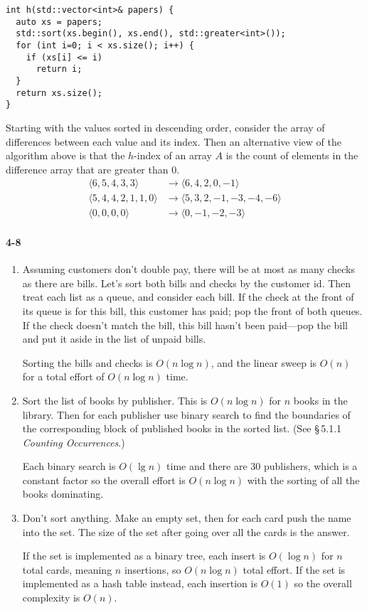 \documentclass{report}
\begin{document}
\begin{lstlisting}
int h(std::vector<int>& papers) {
  auto xs = papers;
  std::sort(xs.begin(), xs.end(), std::greater<int>());
  for (int i=0; i < xs.size(); i++) {
    if (xs[i] <= i)
      return i;
  }
  return xs.size();
}
\end{lstlisting}

Starting with the values sorted in descending order, consider the array of differences between each value and its index. Then an alternative view of the algorithm above is that the $h$-index of an array $A$ is the count of elements in the difference array that are greater than 0.
\begin{align*}
	\langle 6,5,4,3,3 \rangle &\to \langle 6,4,2,0,-1 \rangle \\
	\langle 5,4,4,2,1,1,0 \rangle &\to \langle 5,3,2,-1,-3,-4,-6 \rangle \\
	\langle 0,0,0,0 \rangle &\to \langle 0,-1,-2,-3 \rangle
\end{align*}

\paragraph{4-8}
\begin{enumerate}[label=(\alph*)]
	\item Assuming customers don't double pay, there will be at most as many checks as there are bills. Let's sort both bills and checks by the customer id. Then treat each list as a queue, and consider each bill. If the check at the front of its queue is for this bill, this customer has paid; pop the front of both queues. If the check doesn't match the bill, this bill hasn't been paid---pop the bill and put it aside in the list of unpaid bills.

	Sorting the bills and checks is $O(n\log n)$, and the linear sweep is $O(n)$ for a total effort of $O(n\log n)$ time.

	\item Sort the list of books by publisher. This is $O(n\log n)$ for $n$ books in the library. Then for each publisher use binary search to find the boundaries of the corresponding block of published books in the sorted list. (See \S\,5.1.1 {\sl Counting Occurrences\/}.)

	Each binary search is $O(\lg n)$ time and there are 30 publishers, which is a constant factor so the overall effort is $O(n\log n)$ with the sorting of all the books dominating.

	\item Don't sort anything. Make an empty set, then for each card push the name into the set. The size of the set after going over all the cards is the answer.

	If the set is implemented as a binary tree, each insert is $O(\log n)$ for $n$ total cards, meaning $n$ insertions, so $O(n\log n)$ total effort. If the set is implemented as a hash table instead, each insertion is $O(1)$ so the overall complexity is $O(n)$.
\end{enumerate}
\end{document}
